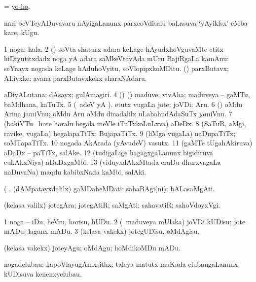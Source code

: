 \bentry
{} 
\gl{\BAavayx} 
\bmng
= \hyperlink{yo-ho}{yo-ho}.
\emng
\eentry

\bentry
{} 
\gl{\BAavayx} 
\bmng
nari beVTeyADuvavaru nAyigaLanunx parxcoVdisalu baLasuva `yAyikfsx' eMba kare, kUgu.
\emng
\eentry

\bentry
{} 
\gl{\nA} 
\bmng
\bnum
\num{1} noga; hala. 
\num{2} (\roVca) soVta shaturx adara keLage hAyudxhoVguvaMte etitx hiDiyutitxdadx noga yA adara saMkeVtavAda mUru BajiRgaLa kamAnu:  seYnayx nogada keLage hAduhoVyitu, soVlopipxkoMDitu. 
 (\rUpa) 
\banum
{} parxButavx; ALivxke:  avana parxButavxkekx sharaNAdaru. 

 aDiyALutana; dAsayx; gulAmagiri. 
\eanum
\numie
\num{4} (\rUpa) (\kanmu) maduve; vivAha; maduveya -- gaMTu, baMdhana, kaTuTx. 
\num{5} (\bava\ adeV yA ). etutx \mo vugaLa jote; joVDi; Aru. 
\num{6} (\pArxparx) oMdu Arina jamiVnu; oMdu Aru oMdu dinadalilx uLabahudAdaSuTx jamiVnu. 
\num{7} (bakiVTu \mo\ hore horalu hegala meVle iTuTxkoLuLxva) aDeDx. 
\num{8} (SaTuR, aMgi, ravike, \mo vugaLa) hegalapaTiTx; BujapaTiTx. 
\num{9} (liMga \mo vugaLa) naDupaTiTx; soMTapaTiTx. 
\num{10} nogada AkArada (yAvudeV) vasutx. 
\num{11} (gaMTe tUgahAkiruva) aDaDx -- paTiTx, salAke. 
\num{12} (tudigaLige hagagxgaLanunx bigidiruva cukAkxNiya) aDaDxgaMbi. 
\num{13} (viduyxdAkxMtada eraDu dhurxvagaLa naDuvaNa) maqdu kabibxNada kaMbi, salAki.
\enum
\emng

\noindent                               
\gl{\pagu} 
\bmng
{} (  . 
\banum
{} (dAMpatayxdalilx) gaMDaheMDati; sahaBAgi(ni); bALasaMgAti.  

  (kelasa \mo valilx) jotegAra; jotegAtiR; saMgAti; sahavatiR; sahoVdoyxVgi.
\eanum
\emng
\eentry

\bentry
{} 
\gl{\sakirx} 
\bmng
\bnum
\num{1} noga -- iDu, heVru, horisu, hUDu. 
\num{2} (\kanmu\ maduveya mUlaka) joVDi kUDisu; jote mADu; laganx mADu. 
\num{3} (kelasa \mo vakekx) jotegUDisu, oMdAgisu.
\enum
\emng

\noindent
\gl{\akirx} 
\bmng
(kelasa \mo vakekx) joteyAgu; oMdAgu; hoMdikoMDu mADu.
\emng
\eentry

\bentry
{} 
\gl{\nA} 
\bmng
nogadelubau; kapoVlayugAmxsithx; taleya matutx muKada elubaugaLanunx kUDisuva kenenxyelubau.
\emng
\eentry

